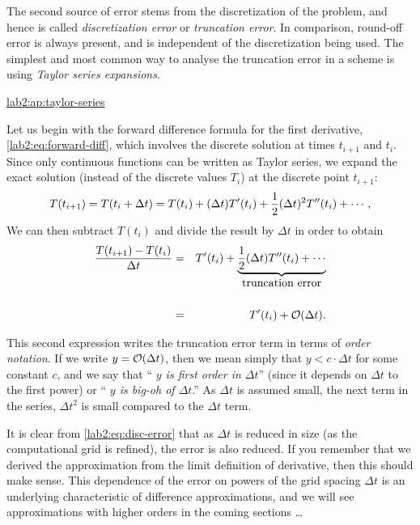 The second source of error stems from the discretization of the
problem, and hence is called \emph{ discretization error}
or \emph{ truncation error}. 
In comparison, round-off error is always present, and is independent
of the discretization being used.
The simplest and most common way to analyse the truncation error in a
scheme is using \emph{ Taylor series expansions}.  
\begin{mathnote}
  \hyperref{Some details on Taylor series\dots }{See Appendix }{ for a
    review of Taylor series.}{lab2:ap:taylor-series}
\end{mathnote}

Let us begin with the forward difference formula for the first
derivative, \eqref{lab2:eq:forward-diff}, which involves the discrete
solution at times $t_{i+1}$ and $t_{i}$.  
Since only continuous functions can be written as Taylor series, we
expand the exact solution (instead of the discrete values $T_i$) at the
discrete point $t_{i+1}$:
\[
  T(t_{i+1}) = T(t_i+\mbox{$\Delta t$}{}) = T(t_i) + (\Delta t) T^\prime(t_i) + 
  \frac{1}{2}(\Delta t)^2 T^{\prime\prime}(t_i) +\cdots,
\]
We can then subtract $T(t_i)$ and divide the result by $\Delta t$ in
order to obtain
\begin{eqnarray}
  \frac{T(t_{i+1})-T(t_i)}{\Delta t} &=& T^{\prime}(t_i) +
  \underbrace{\frac{1}{2}(\Delta t) T^{\prime\prime}(t_i) + \cdots}
_{\mbox{\rm truncation error}} \nonumber \\ \; \nonumber \\
  &=& T^{\prime}(t_i) + {\cal O}(\Delta t).
  \label{lab2:eq:disc-error}
\end{eqnarray}

\begin{note}
This second expression writes the truncation error term in terms of
\emph{ order notation}.  If we write $y = {\cal O}(\Delta t)$, then we
mean simply that $y<c \cdot \Delta t$ for some constant $c$, and we say
that ``\emph{ $y$ is first order in $\Delta t$}'' (since it depends on
$\Delta t$ to the first power) or ``\emph{ $y$ is big-oh of 
  $\Delta t$}.'' As  $\Delta t$ is assumed small, the next term in the 
series, $\Delta t^2$ is small compared to the $\Delta t$ term.
\end{note}

It is clear from \eqref{lab2:eq:disc-error} that as $\Delta t$ is
reduced in size (\ie as the 
computational grid is refined), the error is also reduced.  
If you
remember that we derived the approximation from the limit definition
of derivative, then this should make
sense. 
This dependence of the error on powers of the grid spacing $\Delta t$
is an underlying characteristic of difference approximations, and we
will see approximations with higher orders in the coming sections
\dots 

